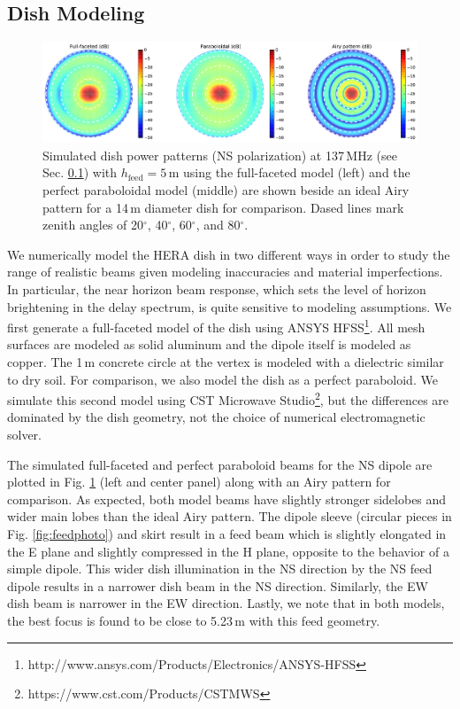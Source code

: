 \subsection{Dish Modeling}
\label{sec:dishmodels}

\begin{figure}
\centering
\includegraphics[width=6in]{chap3_hera_beammapping/dave195_rich195_airy_beams.pdf}
\caption[Simulated dish power patterns.]{Simulated dish power patterns (NS polarization) at 137\,MHz (see Sec. \ref{sec:dishmodels}) with $h_\text{feed}=5$\,m using the full-faceted model (left) and the perfect paraboloidal model (middle) are shown beside an ideal Airy pattern for a 14\,m diameter dish for comparison. Dased lines mark zenith angles of 20$^\circ$, 40$^\circ$, 60$^\circ$, and 80$^\circ$.}
\label{fig:modelbeams}
\end{figure}

We numerically model the HERA dish in two different ways in order to study the range of realistic beams given modeling inaccuracies and material imperfections. In particular, the near horizon beam response, which sets the level of horizon brightening in the delay spectrum, is quite sensitive to modeling assumptions. We first generate a full-faceted model of the dish using ANSYS HFSS\footnote{http://www.ansys.com/Products/Electronics/ANSYS-HFSS}. All mesh surfaces are modeled as solid aluminum and the dipole itself is modeled as copper. The 1\,m concrete circle at the vertex is modeled with a dielectric similar to dry soil. For comparison, we also model the dish as a perfect paraboloid. We simulate this second model using CST Microwave Studio\footnote{https://www.cst.com/Products/CSTMWS}, but the differences are dominated by the dish geometry, not the choice of numerical electromagnetic solver. 

The simulated full-faceted and perfect paraboloid beams for the NS dipole are plotted in Fig. \ref{fig:modelbeams} (left and center panel) along with an Airy pattern for comparison. As expected, both model beams have slightly stronger sidelobes and wider main lobes than the ideal Airy pattern. The dipole sleeve (circular pieces in Fig. \ref{fig:feedphoto}) and skirt result in a feed beam which is slightly elongated in the E plane and slightly compressed in the H plane, opposite to the behavior of a simple dipole. This wider dish illumination in the NS direction by the NS feed dipole results in a narrower dish beam in the NS direction. Similarly, the EW dish beam is narrower in the EW direction. Lastly, we note that in both models, the best focus is found to be close to 5.23\,m with this feed geometry.

